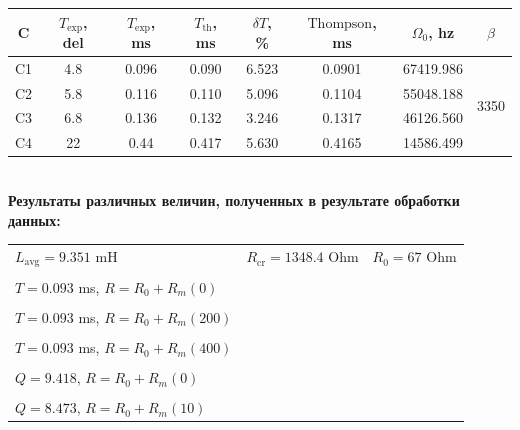 \documentclass[12pt,a4paper]{report}
\begin{document}
\hfill\break
\hfill\break
\begin{tabular}{|c|c|c|c|c|c|c|c|}
    \hline
    C & $T_\text{exp}$, del & $T_\text{exp}$, ms & $T_\text{th}$, ms & $\delta T$, \% & $\text{Thompson}$, ms & $\Omega_0$, hz & $\beta$ \\
    \hline
    C1 & 4.8 & 0.096 & 0.090 & 6.523 & 0.0901 & 67419.986 & \multirow{4}{*}{3350} \\
    \cline{1-7}
    C2 & 5.8 & 0.116 & 0.110 & 5.096 & 0.1104 & 55048.188 & \\
    \cline{1-7}
    C3 & 6.8 & 0.136 & 0.132 & 3.246 & 0.1317 & 46126.560 & \\
    \cline{1-7}
    C4 & 22 & 0.44 & 0.417 & 5.630 & 0.4165 & 14586.499 & \\
    \hline
\end{tabular}\\
\hfill\break
\textbf{Результаты различных величин, полученных в результате обработки данных:} \\
\hfill\break
\begin{tabular}{lll}
    $L_\text{avg}=9.351$ mH & $R_\text{cr}=1348.4$ Ohm & $R_0=67$ Ohm \\
    \hspace{5cm} & \hspace{5cm} & \hspace{5cm} \\
    $T=0.093$ ms, $R=R_0+R_m(0)$ \\
    \hspace{5cm} & \hspace{5cm} & \hspace{5cm} \\
    $T=0.093$ ms, $R=R_0+R_m(200)$ \\
    \hspace{5cm} & \hspace{5cm} & \hspace{5cm} \\
    $T=0.093$ ms, $R=R_0+R_m(400)$ \\
    \hspace{5cm} & \hspace{5cm} & \hspace{5cm} \\
    $Q=9.418$, $R = R_0+R_m(0)$ \\
    \hspace{5cm} & \hspace{5cm} & \hspace{5cm} \\
    $Q=8.473$, $R = R_0+R_m(10)$ \\
\end{tabular} \\
\end{document}
